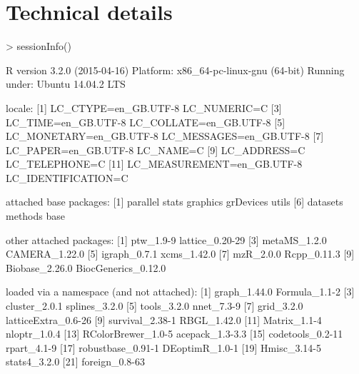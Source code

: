 \documentclass[a4paper,11pt]{article}
\begin{document}
\section{Technical details}
\begin{Schunk}
\begin{Sinput}
> sessionInfo()
\end{Sinput}
\begin{Soutput}
R version 3.2.0 (2015-04-16)
Platform: x86_64-pc-linux-gnu (64-bit)
Running under: Ubuntu 14.04.2 LTS

locale:
 [1] LC_CTYPE=en_GB.UTF-8       LC_NUMERIC=C              
 [3] LC_TIME=en_GB.UTF-8        LC_COLLATE=en_GB.UTF-8    
 [5] LC_MONETARY=en_GB.UTF-8    LC_MESSAGES=en_GB.UTF-8   
 [7] LC_PAPER=en_GB.UTF-8       LC_NAME=C                 
 [9] LC_ADDRESS=C               LC_TELEPHONE=C            
[11] LC_MEASUREMENT=en_GB.UTF-8 LC_IDENTIFICATION=C       

attached base packages:
[1] parallel  stats     graphics  grDevices utils    
[6] datasets  methods   base     

other attached packages:
 [1] ptw_1.9-9           lattice_0.20-29    
 [3] metaMS_1.2.0        CAMERA_1.22.0      
 [5] igraph_0.7.1        xcms_1.42.0        
 [7] mzR_2.0.0           Rcpp_0.11.3        
 [9] Biobase_2.26.0      BiocGenerics_0.12.0

loaded via a namespace (and not attached):
 [1] graph_1.44.0        Formula_1.1-2      
 [3] cluster_2.0.1       splines_3.2.0      
 [5] tools_3.2.0         nnet_7.3-9         
 [7] grid_3.2.0          latticeExtra_0.6-26
 [9] survival_2.38-1     RBGL_1.42.0        
[11] Matrix_1.1-4        nloptr_1.0.4       
[13] RColorBrewer_1.0-5  acepack_1.3-3.3    
[15] codetools_0.2-11    rpart_4.1-9        
[17] robustbase_0.91-1   DEoptimR_1.0-1     
[19] Hmisc_3.14-5        stats4_3.2.0       
[21] foreign_0.8-63     
\end{Soutput}
\end{Schunk}
\end{document}
